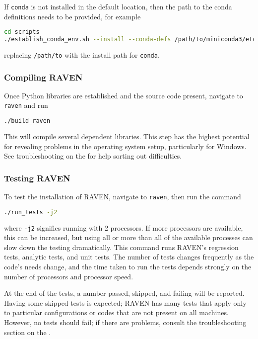 \nb If \texttt{conda} is not installed in the default location, then the path to the conda definitions
needs to be provided, for example
\begin{lstlisting}[language=bash]
cd scripts
./establish_conda_env.sh --install --conda-defs /path/to/miniconda3/etc/profile.d/conda.sh
\end{lstlisting}
replacing \texttt{/path/to} with the install path for \texttt{conda}.




\subsubsection{Compiling RAVEN}
Once Python libraries are established and the source code present, navigate to \texttt{raven} and run
\begin{lstlisting}[language=bash]
./build_raven
\end{lstlisting}
This will compile several dependent libraries.  This step has the highest potential for revealing problems in
the operating system setup, particularly for Windows.  See troubleshooting on the \wiki for help sorting out
difficulties.




\subsubsection{Testing RAVEN}
\label{sec:testing raven}
To test the installation of RAVEN, navigate to \texttt{raven}, then run the command
\begin{lstlisting}[language=bash]
./run_tests -j2
\end{lstlisting}
where \texttt{-j2} signifies running with 2 processors.  If more processors are available, this can be
increased, but using all or more than all of the available processes can slow down the testing dramatically.
This command runs RAVEN's regression tests, analytic tests, and unit tests.  The number of tests changes
frequently as the code's needs change, and the time taken to run the tests depends strongly on the number of
processors and processor speed.

At the end of the tests, a number passed, skipped, and failing will be reported.  Having some skipped tests is
expected; RAVEN has many tests that apply only to particular configurations or codes that are not present on
all machines.  However, no tests should fail; if there are problems, consult the troubleshooting section on
the \wiki.


